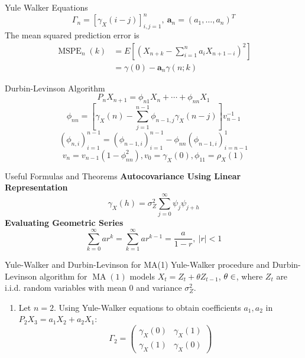 \documentclass{article}
\DeclareMathOperator{\mspe}{MSPE}
\DeclareMathOperator{\ma}{MA}
\begin{document}
\begin{multicols*}{3}
\begin{blackbox}{Yule Walker Equations}
    \[\Gamma_n = \left[\gamma_X(i-j)\right]^n_{i,j=1}, \ \textbf{a}_n = (a_1, \ldots, a_n)^T\]   
    The mean squared prediction error is \\[-4ex]
    \begin{align*}
        \mspe_n(k) &= E\left[\left(X_{n+k} - \sum_{i=1}^na_iX_{ n+1-    i}\right)^2\right]\\
        &= \gamma(0) - \textbf{a}_n\gamma(n;k)  
    \end{align*}
\end{blackbox}

\begin{blackbox}{Durbin-Levinson Algorithm}
    \[P_nX_{n+1} = \phi_{n1} X_n + \cdots + \phi_{nn}X_1\]
    \[\phi_{nn} = \left[\gamma_X(n) - \sum_{j=1}^{n-1}\phi_{n-1,j}\gamma_X(n-j)\right]v_{n-1}^{-1}\]
    \[(\phi_{n,i})_{i=1}^{n-1} = (\phi_{n-1,i})_{i=1}^{n-1} - \phi_{nn}(\phi_{n-1,i})_{i=n-1}^{1}\]
    \[v_n = v_{n-1}(1-\phi_{nn}^2), v_0 = \gamma_X(0), \phi_{11} = \rho_X(1)\]
    \vspace{-4ex}
\end{blackbox}
\begin{blackbox}{Useful Formulas and Theorems}
    \textbf{Autocovariance Using Linear Representation}\\[-2ex]
    \[\gamma_X(h) = \sigma_Z^2\sum_{j=0}^{\infty} \psi_j \psi_{j+h}\]
    \textbf{Evaluating Geometric Series}\\[-2ex]
    \[\sum_{k=0}^{\infty}ar^k = \sum_{k=1}^{\infty}ar^{k-1} = \frac{a}{1-r}, \ |r| < 1\]
\end{blackbox}

\begin{blackbox}{Yule-Walker and Durbin-Levinson for MA(1)}
    Yule-Walker procedure and Durbin-Levinson algorithm for $\ma(1)$ models $X_t = Z_t + \theta Z_{t-1}$, $\theta \in \real$, where $Z_t$ are i.i.d. random variables with mean 0 and variance $\sigma_Z^2$. 
\begin{enumerate}[label=\alph*), leftmargin=5pt]
    \item Let $n=2$. Using Yule-Walker equations to obtain coefficients $a_1,a_2$ in $P_2X_3 = a_1X_2 + a_2X_1$:\\[-2ex]
    \[\Gamma_2 = \begin{pmatrix}
        \gamma_X(0) & \gamma_X(1)\\
        \gamma_X(1) & \gamma_X(0)
    \end{pmatrix}\]
    \vspace{-6ex}


\end{enumerate}
\end{blackbox}
\end{multicols*}
\end{document}
